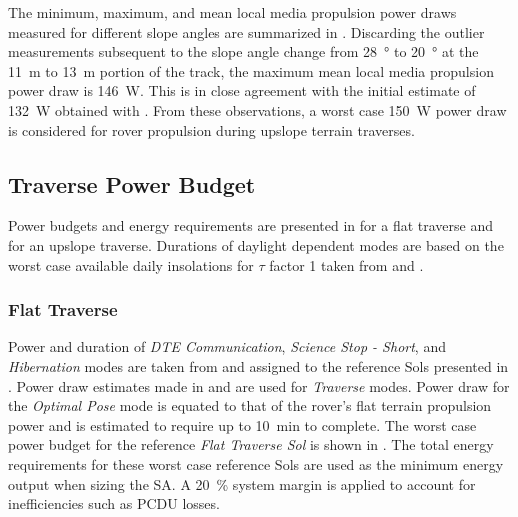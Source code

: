 The minimum, maximum, and mean local media propulsion power draws measured for different slope angles are summarized in . Discarding the outlier measurements subsequent to the slope angle change from \SI{28}{\degree} to \SI{20}{\degree} at the \SI{11}{\meter} to \SI{13}{\meter} portion of the track, the maximum mean local media propulsion power draw is \SI{146}{\watt}. This is in close agreement with the initial estimate of \SI{132}{\watt} obtained with . From these observations, a worst case \SI{150}{\watt} power draw is considered for rover propulsion during upslope terrain traverses.



\subsection{Traverse Power Budget}
\label{sec:PowerBudget:PowerBudget:TraversePowerBudget}
Power budgets and energy requirements are presented in  for a flat traverse and  for an upslope traverse. Durations of daylight dependent modes are based on the worst case available daily insolations for $\tau$ factor 1 taken from  and .



\subsubsection{Flat Traverse}
\label{sec:Design:PowerBudget:TraversePowerBudget:FlatTraverse}

Power and duration of \textit{\ac{DTE} Communication}, \textit{Science Stop - Short}, and \textit{Hibernation} modes are taken from  and assigned to the reference Sols presented in . Power draw estimates made in  and  are used for \textit{Traverse} modes. Power draw for the \textit{Optimal Pose} mode is equated to that of the rover's flat terrain propulsion power and is estimated to require up to \SI{10}{\minute} to complete. The worst case power budget for the reference \textit{Flat Traverse Sol} is shown in . The total energy requirements for these worst case reference Sols are used as the minimum energy output when sizing the \ac{SA}. A \SI{20}{\percent} system margin is applied to account for inefficiencies such as \ac{PCDU} losses.


